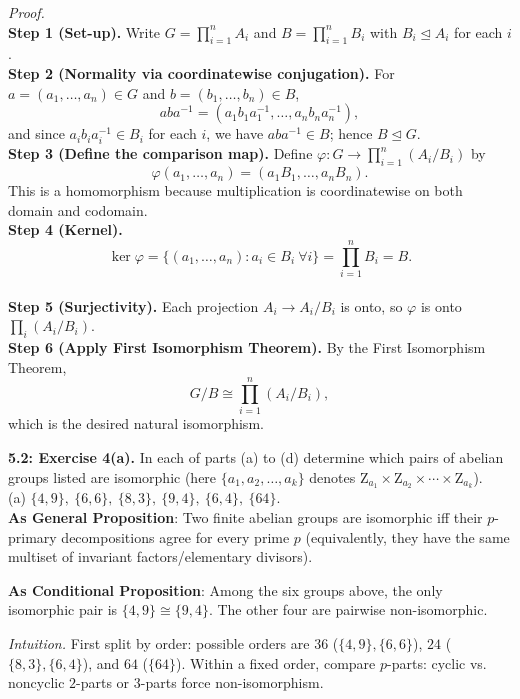 \documentclass[11pt]{article}
\theoremstyle{definition}
\newcommand{\Z}{\mathrm{Z}}
\begin{document}
\dotfill

\emph{Proof.}\\
\textbf{Step 1 (Set-up).} Write $G=\prod_{i=1}^n A_i$ and $B=\prod_{i=1}^n B_i$ with $B_i\unlhd A_i$ for each $i$.\\
\textbf{Step 2 (Normality via coordinatewise conjugation).} For $a=(a_1,\ldots,a_n)\in G$ and $b=(b_1,\ldots,b_n)\in B$,
\[
aba^{-1}=(a_1b_1a_1^{-1},\ldots,a_nb_na_n^{-1}),
\]
and since $a_ib_ia_i^{-1}\in B_i$ for each $i$, we have $aba^{-1}\in B$; hence $B\unlhd G$.\\
\textbf{Step 3 (Define the comparison map).} Define $\varphi:G\to \prod_{i=1}^n (A_i/B_i)$ by
\[
\varphi(a_1,\ldots,a_n)=(a_1B_1,\ldots,a_nB_n).
\]
This is a homomorphism because multiplication is coordinatewise on both domain and codomain.\\
\textbf{Step 4 (Kernel).} 
\[
\ker\varphi=\{(a_1,\ldots,a_n):a_i\in B_i\ \forall i\}=\prod_{i=1}^n B_i=B.
\] \\
\textbf{Step 5 (Surjectivity).} Each projection $A_i\to A_i/B_i$ is onto, so $\varphi$ is onto $\prod_i (A_i/B_i)$.\\
\textbf{Step 6 (Apply First Isomorphism Theorem).} By the First Isomorphism Theorem, 
\[
G/B\cong \prod_{i=1}^n (A_i/B_i),
\]
which is the desired natural isomorphism.\\

\newpage

\noindent \textbf{5.2: Exercise 4(a).} In each of parts (a) to (d) determine which pairs of abelian groups listed are isomorphic (here $\{a_1,a_2,\dots,a_k\}$ denotes $\Z_{a_1}\times\Z_{a_2}\times\cdots\times\Z_{a_k}$).
\\
(a) $\{4,9\},\ \{6,6\},\ \{8,3\},\ \{9,4\},\ \{6,4\},\ \{64\}$. \\ %

\noindent\textbf{As General Proposition}: Two finite abelian groups are isomorphic iff their $p$-primary decompositions agree for every prime $p$ (equivalently, they have the same multiset of invariant factors/elementary divisors).

\noindent \textbf{As Conditional Proposition}: Among the six groups above, the only isomorphic pair is $\{4,9\}\cong\{9,4\}$. The other four are pairwise non-isomorphic.

\newpage

\dotfill

\emph{Intuition.} First split by order: possible orders are $36$ ($\{4,9\},\{6,6\}$), $24$ ($\{8,3\},\{6,4\}$), and $64$ ($\{64\}$). Within a fixed order, compare $p$-parts: cyclic vs. noncyclic $2$-parts or $3$-parts force non-isomorphism.
\end{document}
